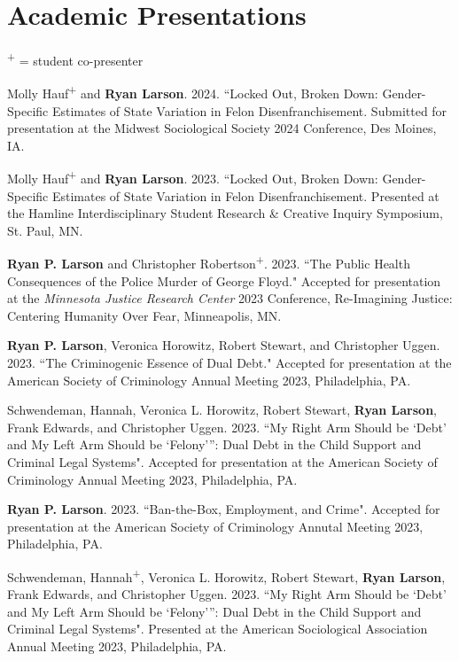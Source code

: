 \documentclass[letterpaper]{article}
\renewenvironment{itemize}{
  \begin{list}{}{
    \setlength{\leftmargin}{1.5em}
  }
}{
  \end{list}
}
\begin{document}
\section*{\textbf{Academic Presentations}} \textsuperscript{+} = student co-presenter
\begin{itemize}

\item Molly Hauf\textsuperscript{+} and \textbf{Ryan Larson}. 2024. ``Locked Out, Broken Down: Gender-Specific Estimates of State Variation in Felon Disenfranchisement. Submitted for presentation at the Midwest Sociological Society 2024 Conference, Des Moines, IA. 

\item Molly Hauf\textsuperscript{+} and \textbf{Ryan Larson}. 2023. ``Locked Out, Broken Down: Gender-Specific Estimates of State Variation in Felon Disenfranchisement. Presented at the Hamline Interdisciplinary Student Research \& Creative Inquiry Symposium, St. Paul, MN. 

\item \textbf{Ryan P. Larson} and Christopher Robertson\textsuperscript{+}. 2023. ``The Public Health Consequences of the Police Murder of George Floyd." Accepted for presentation at the \textit{Minnesota Justice Research Center} 2023 Conference, Re-Imagining Justice: Centering Humanity Over Fear, Minneapolis, MN.   

\item \textbf{Ryan P. Larson}, Veronica Horowitz, Robert Stewart, and Christopher Uggen. 2023. ``The Criminogenic Essence of Dual Debt." Accepted for presentation at the American Society of Criminology Annual Meeting 2023, Philadelphia, PA. 

\item Schwendeman, Hannah, Veronica L. Horowitz, Robert Stewart, \textbf{Ryan Larson}, Frank Edwards, and Christopher Uggen. 2023. ``My Right Arm Should be ‘Debt’ and My Left Arm Should be ‘Felony’”:
Dual Debt in the Child Support and Criminal Legal Systems". Accepted for presentation at the American Society of Criminology Annual Meeting 2023, Philadelphia, PA. 

\item \textbf{Ryan P. Larson}. 2023. ``Ban-the-Box, Employment, and Crime". Accepted for presentation at the American Society of Criminology Annutal Meeting 2023, Philadelphia, PA. 
\item Schwendeman, Hannah\textsuperscript{+}, Veronica L. Horowitz, Robert Stewart, \textbf{Ryan Larson}, Frank Edwards, and Christopher Uggen. 2023. ``My Right Arm Should be ‘Debt’ and My Left Arm Should be ‘Felony’”:
Dual Debt in the Child Support and Criminal Legal Systems". Presented at the American Sociological Association Annual Meeting 2023, Philadelphia, PA. 


\end{itemize}
\end{document}
